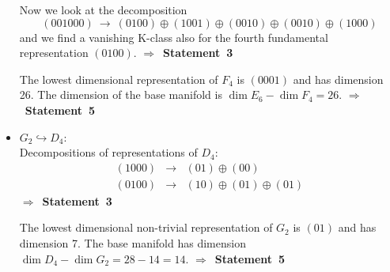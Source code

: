 \documentclass[12pt,a4paper]{article}
\newcommand{\embin}{{\hookrightarrow}}
\begin{document}
\begin{appendix}
\begin{itemize}
Now we look at the decomposition
\[
(001000)\ \longrightarrow\ (0100)\oplus (1001)\oplus (0010)\oplus
(0010)\oplus (1000)
\]
and we find a vanishing K-class also for the fourth 
fundamental representation $(0100)$. $\Rightarrow $~{\bf Statement~3}

The lowest dimensional representation of $F_{4}$ is $(0001)$ and has
dimension 26. The dimension of the base manifold is $\dim E_{6}-\dim
F_{4}=26$. $\Rightarrow $~{\bf Statement~5} 

\item $G_{2}\embin D_{4}$:\\
Decompositions of representations of $D_{4}$:
\begin{eqnarray*}
(1000)& \longrightarrow & (01)\oplus (00)\\
(0100)& \longrightarrow & (10)\oplus (01)\oplus (01)
\end{eqnarray*} 
$\Rightarrow $~{\bf Statement~3}

The lowest dimensional non-trivial representation of $G_{2}$ is
$(01)$ and has dimension 7. The base manifold has dimension $\dim
D_{4}-\dim G_{2}=28-14=14$. $\Rightarrow $~{\bf Statement~5}
\end{itemize}
\end{appendix}

\newpage
\end{document}
